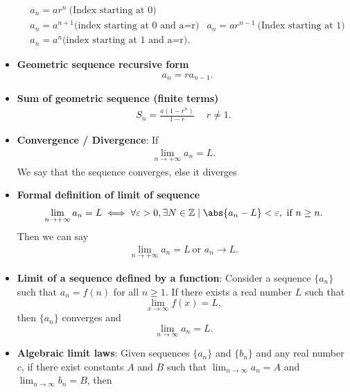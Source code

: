 \documentclass{report}
\begin{document}
\begin{itemize}
        \begin{align*}
            &a_{n} = ar^{n}\ \text{(Index starting at 0)} \\
            &a_{n} = a^{n+1} \text{(index starting at 0 and a=r)}
            &a_{n} = ar^{n-1}\ \text{(Index starting at 1)} \\
            &a_{n} = a^{n} \text{(index starting at 1 and a=r)}
        .\end{align*}
    \item \textbf{Geometric sequence recursive form}
        \begin{align*}
            &a_{n} = ra_{n-1}
        .\end{align*}
    \item \textbf{Sum of geometric sequence (finite terms)}
        \begin{align*}
            S_{n} = \frac{a(1-r^{n})}{1-r}\ \quad r\ne 1
        .\end{align*}
    \item \textbf{Convergence / Divergence}: If 
        \begin{align*}
            \lim\limits_{n \to +\infty}{a_{n}} = L
        .\end{align*}
        We say that the sequence converges, else it diverges
    \item \textbf{Formal definition of limit of sequence}
        \begin{align*}
            \lim\limits_{n \to +\infty}{a_{n}= L} \iff \forall \varepsilon > 0, \exists N \in \mathbb{Z} \mid \abs{a_{n} - L} < \varepsilon,\ \text{if } n \geq n
        .\end{align*}
        Then we can say 
        \begin{align*}
            \lim\limits_{n \to +\infty}{a_{n} = L}\ \text{or } a_{n} \rightarrow L 
        .\end{align*}
    \item \textbf{Limit of a sequence defined by a function}:         Consider a sequence \( \{a_n\} \) such that \( a_n = f(n) \) for all \( n \geq 1 \). If there exists a real number \( L \) such that
        \[
        \lim_{{x \to \infty}} f(x) = L,
        \]
        then \( \{a_n\} \) converges and
        \[
        \lim_{{n \to \infty}} a_n = L.
        \]
    \item \textbf{Algebraic limit laws}:
          Given sequences \( \{a_n\} \) and \( \{b_n\} \) and any real number \( c \), if there exist constants \( A \) and \( B \) such that \( \lim_{{n \to \infty}} a_n = A \) and \( \lim_{{n \to \infty}} b_n = B \), then

\end{itemize}
\end{document}
